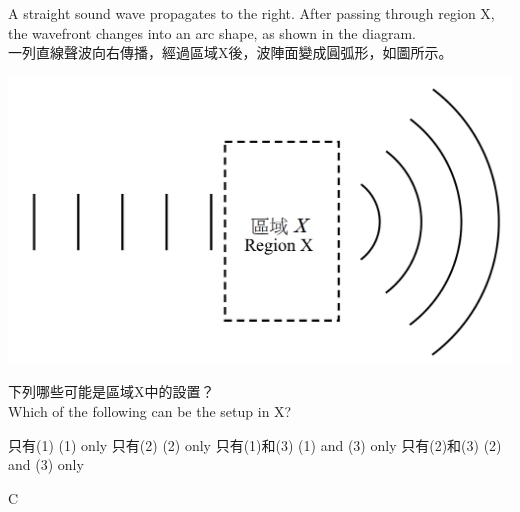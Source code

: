 {
    A straight sound wave propagates to the right. After passing through region X, the wavefront changes into an arc shape, as shown in the diagram.\\一列直線聲波向右傳播，經過區域X後，波陣面變成圓弧形，如圖所示。
    \par{\par\centering\includegraphics[width=.5\textwidth]{./img/ch2_weekend_mc_2024-05-31-19-03-39.png}\par}
    下列哪些可能是區域X中的設置？\\Which of the following can be the setup in X?
    \begin{statements}
        \task {}
        \task {}
        \task {}
    \end{statements}

    \begin{tasks}
        \task 只有(1) \tab\tab  (1) only
        \task 只有(2) \tab\tab  (2) only
        \task 只有(1)和(3) \tab\tab  (1) and (3) only
        \task 只有(2)和(3) \tab \tab (2) and (3) only
    \end{tasks}
}{C}

